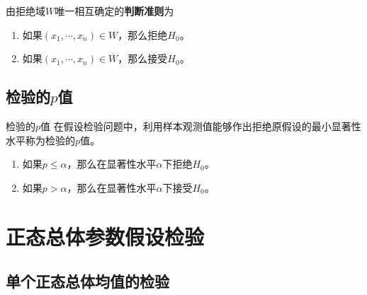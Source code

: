 \documentclass[lang = cn, scheme = chinese, thmcnt = section]{elegantbook}
\begin{document}
由拒绝域$W$唯一相互确定的\textbf{判断准则}为

\begin{enumerate}
	\item 如果$(x_1,\cdots,x_n)\in W$，那么拒绝$H_0$。
	\item 如果$(x_1,\cdots,x_n)\in \overline{W}$，那么接受$H_0$。
\end{enumerate}

\subsection{检验的$p$值}

\begin{definition}{检验的$p$值}
	在假设检验问题中，利用样本观测值能够作出拒绝原假设的最小显著性水平称为检验的$p$值。
	\begin{enumerate}
		\item 如果$p\le\alpha$，那么在显著性水平$\alpha$下拒绝$H_0$。
		\item 如果$p>\alpha$，那么在显著性水平$\alpha$下接受$H_0$。
	\end{enumerate}
\end{definition}

\section{正态总体参数假设检验}

\subsection{单个正态总体均值的检验}

\begin{table}[H]
	\centering
	\caption{单个正态总体均值的检验}
	\renewcommand{\arraystretch}{1.5}
\end{table}
\end{document}
